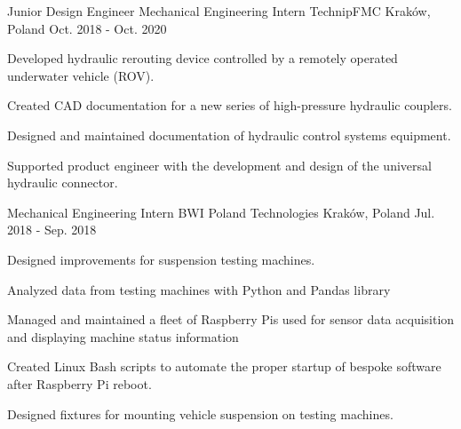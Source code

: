 \begin{cventries}
  \cventry
    {Junior Design Engineer {\enskip\cdotp\enskip} Mechanical Engineering Intern} %
    {TechnipFMC} %
    {Kraków, Poland} %
    {Oct. 2018 - Oct. 2020} %
    {
      \begin{cvitems} %
      \item{Developed hydraulic rerouting device controlled by a remotely operated underwater vehicle (ROV).}
      \item{Created CAD documentation for a new series of high-pressure hydraulic couplers.}
      \item{Designed and maintained documentation of hydraulic control systems equipment.}
      \item{Supported product engineer with the development and design of the universal hydraulic connector.}
      \end{cvitems}
    }
    
      \cventry
    {Mechanical Engineering Intern} %
    {BWI Poland Technologies} %
    {Kraków, Poland} %
    {Jul. 2018 - Sep. 2018} %
    {
      \begin{cvitems} %
      \item{Designed improvements for suspension testing machines.}
      \item{Analyzed data from testing machines with Python and Pandas library}
      \item{Managed and maintained a fleet of Raspberry Pis used for sensor data acquisition and displaying machine status information}
      \item{Created Linux Bash scripts to automate the proper startup of bespoke software after Raspberry Pi reboot.}
      \item{Designed fixtures for mounting vehicle suspension on testing machines.}
      \end{cvitems}
    }
\end{cventries}
